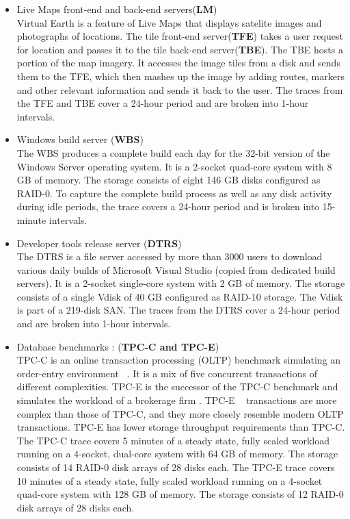 \begin{itemize}
\item Live Maps front-end and back-end servers(\textbf{LM}) \\
 \indent Virtual Earth is a feature of Live Maps that displays satelite images and photographs of locations. The tile front-end server(\textbf{TFE}) takes a user request for location and passes it to the tile back-end server(\textbf{TBE}). The TBE hosts a portion of the map imagery. It accesses the image tiles from a disk and sends them to the TFE, which then mashes up the image by adding routes, markers and other relevant information and sends it back to the user. The traces from the TFE and TBE cover a 24-hour period and are broken into 1-hour intervals.
\end{itemize}

\begin{itemize}
\item Windows build server (\textbf{WBS}) \\
 The WBS produces a complete build each day for the
32-bit version of the Windows Server operating system. It is
a 2-socket quad-core system with 8 GB of memory. The
storage consists of eight 146 GB disks configured as
RAID-0. To capture the complete build process as well as
any disk activity during idle periods, the trace covers a
24-hour period and is broken into 15-minute intervals.
\end{itemize}

\begin{itemize}
\item Developer tools release server (\textbf{DTRS}) \\
 The DTRS is a file server accessed by more than
3000 users to download various daily builds of Microsoft
Visual Studio (copied from dedicated build servers). It is a
2-socket single-core system with 2 GB of memory. The
storage consists of a single Vdisk of 40 GB configured as
RAID-10 storage. The Vdisk is part of a 219-disk SAN. The
traces from the DTRS cover a 24-hour period and are broken
into 1-hour intervals.
\end{itemize}

\begin{itemize}
\item Database benchmarks :  (\textbf{TPC-C and TPC-E}) \\
TPC-C is an online transaction processing (OLTP)
benchmark simulating an order-entry environment ~\cite{tpcc}. It is
a mix of five concurrent transactions of different
complexities. TPC-E is the successor of the TPC-C
benchmark and simulates the workload of a brokerage firm
. TPC-E ~\cite{tpcc} transactions are more complex than those of
TPC-C, and they more closely resemble modern OLTP
transactions. TPC-E has lower storage throughput
requirements than TPC-C. The TPC-C trace covers
5 minutes of a steady state, fully scaled workload running on
a 4-socket, dual-core system with 64 GB of memory. The
storage consists of 14 RAID-0 disk arrays of 28 disks each.
The TPC-E trace covers 10 minutes of a steady state, fully
scaled workload running on a 4-socket quad-core system
with 128 GB of memory. The storage consists of 12 RAID-0
disk arrays of 28 disks each.
\end{itemize}